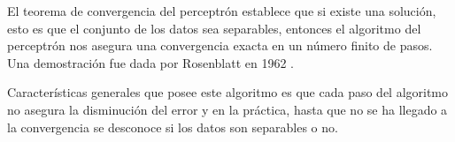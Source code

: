 El teorema de convergencia del perceptrón establece que si existe una solución, esto es
que el conjunto de los datos sea separables, entonces el algoritmo del perceptrón
nos asegura una convergencia exacta en un número finito de pasos. 
Una demostración fue dada por Rosenblatt en 1962 \cite{perceptron-convergence}.  

Características generales que posee este algoritmo es que
cada paso del algoritmo no asegura la disminución del error y en la práctica, hasta que no se 
ha llegado a la convergencia se desconoce si los datos son separables o no. 











